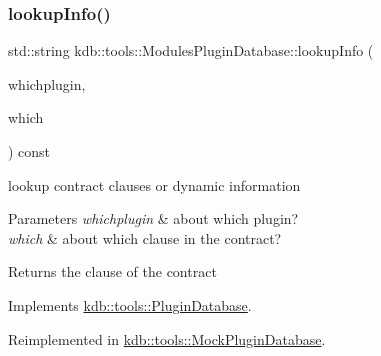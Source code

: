 \mbox{\label{classkdb_1_1tools_1_1ModulesPluginDatabase_a3f51beee8aecb4371e7d12e98958f875}} 
\subsubsection{\texorpdfstring{lookup\+Info()}{lookupInfo()}}
{\footnotesize\ttfamily std\+::string kdb\+::tools\+::\+Modules\+Plugin\+Database\+::lookup\+Info (\begin{DoxyParamCaption}\item[{\hyperlink{classkdb_1_1tools_1_1PluginSpec}{Plugin\+Spec} const \&}]{whichplugin,  }\item[{std\+::string const \&}]{which }\end{DoxyParamCaption}) const\hspace{0.3cm}{\ttfamily [virtual]}}



lookup contract clauses or dynamic information 


\begin{DoxyParams}{Parameters}
{\em whichplugin} & about which plugin? \\
\hline
{\em which} & about which clause in the contract?\\
\hline
\end{DoxyParams}
\begin{DoxyReturn}{Returns}
the clause of the contract 
\end{DoxyReturn}


Implements \hyperlink{classkdb_1_1tools_1_1PluginDatabase_ac0af2ec31a98f4176c19eaf34977abbe}{kdb\+::tools\+::\+Plugin\+Database}.



Reimplemented in \hyperlink{classkdb_1_1tools_1_1MockPluginDatabase_ae352c27aa51bc8c2ea8c708d14f6fc76}{kdb\+::tools\+::\+Mock\+Plugin\+Database}.

\mbox{\label{classkdb_1_1tools_1_1ModulesPluginDatabase_aa7f244f0271ea9b2a3f5b52779167f55}} 
